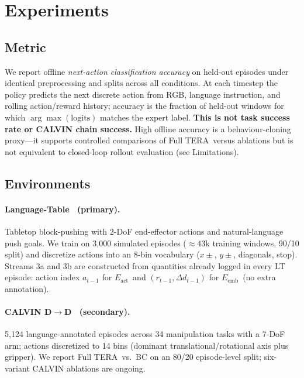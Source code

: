 \documentclass{article}
\newcommand{\modelname}{\textsc{TERA}\xspace}
\newcommand{\Lact}{$E_{\mathrm{act}}$\xspace}
\newcommand{\Lexp}{$E_{\mathrm{emb}}$\xspace}
\begin{document}
\section{Experiments}
\label{sec:experiments}

\subsection{Metric}
\label{sec:metrics}

We report offline \emph{next-action classification accuracy} on held-out
episodes under identical preprocessing and splits across all conditions.
At each timestep the policy predicts the next discrete action from RGB,
language instruction, and rolling action/reward history;
accuracy is the fraction of held-out windows for which
$\arg\max(\mathrm{logits})$ matches the expert label.
\textbf{This is not task success rate or CALVIN chain success.}
High offline accuracy is a behaviour-cloning proxy---it supports controlled
comparisons of Full \modelname\ versus ablations but is not equivalent to
closed-loop rollout evaluation (see Limitations).

\subsection{Environments}

\paragraph{Language-Table~\citep{lynch2023languagetable} (primary).}
Tabletop block-pushing with 2-DoF end-effector actions and
natural-language push goals.
We train on 3,000 simulated episodes (${\approx}43$k training windows, 90/10
split) and discretize actions into an 8-bin vocabulary ($x{\pm}$, $y{\pm}$,
diagonals, stop).
Streams 3a and 3b are constructed from quantities already logged in every LT
episode: action index $a_{t-1}$ for \Lact\ and $(r_{t-1}, \Delta d_{t-1})$ for
\Lexp\ (no extra annotation).

\paragraph{CALVIN D$\to$D~\citep{mees2022calvin} (secondary).}
5,124 language-annotated episodes across 34 manipulation tasks with a 7-DoF
arm; actions discretized to 14 bins (dominant translational/rotational axis
plus gripper).
We report Full \modelname\ vs.\ BC on an 80/20 episode-level split;
six-variant CALVIN ablations are ongoing.
\end{document}
